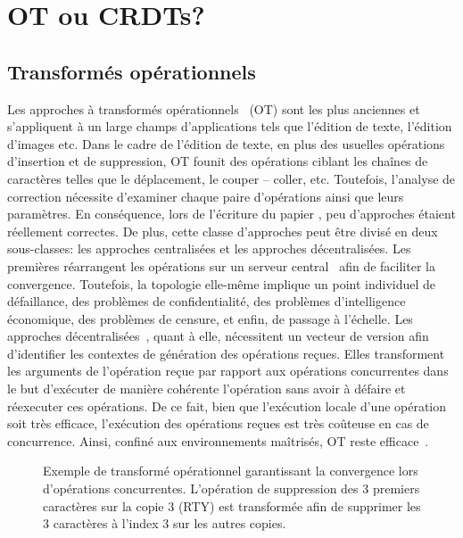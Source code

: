 
\section{OT ou CRDTs?}

\subsection{Transformés opérationnels}

Les approches à transformés opérationnels~\cite{sun1998operational,
  sun2009contextbased} (OT) sont les plus anciennes et s'appliquent à un large
champs d'applications tels que l'édition de texte, l'édition d'images etc. Dans
le cadre de l'édition de texte, en plus des usuelles opérations d'insertion et
de suppression, OT founit des opérations ciblant les chaînes de caractères
telles que le déplacement, le couper -- coller, etc. Toutefois, l'analyse de
correction nécessite d'examiner chaque paire d'opérations ainsi que leurs
paramètres. En conséquence, lors de l'écriture du papier
\cite{imine2003proving}, peu d'approches étaient réellement correctes. De plus,
cette classe d'approches peut être divisé en deux sous-classes: les approches
centralisées et les approches décentralisées. Les premières réarrangent les
opérations sur un serveur central~\cite{nichols1995high} afin de faciliter la
convergence. Toutefois, la topologie elle-même implique un point individuel de
défaillance, des problèmes de confidentialité, des problèmes d'intelligence
économique, des problèmes de censure, et enfin, de passage à l'échelle. Les
approches décentralisées~\cite{sun2009contextbased}, quant à elle, nécessitent
un vecteur de version afin d'identifier les contextes de génération des
opérations reçues. Elles transforment les arguments de l'opération reçue par
rapport aux opérations concurrentes dans le but d'exécuter de manière cohérente
l'opération sans avoir à défaire et réexecuter ces opérations. De ce fait, bien
que l'exécution locale d'une opération soit très efficace, l'exécution des
opérations reçues est très coûteuse en cas de concurrence. Ainsi, confiné aux
environnements maîtrisés, OT reste efficace~\cite{mehdi2014merging}.

\begin{figure}
  \centering
  
  \caption{\label{seq:fig:otexample}Exemple de transformé opérationnel
    garantissant la convergence lors d'opérations concurrentes. L'opération de
    suppression des 3 premiers caractères sur la copie 3 (RTY) est transformée
    afin de supprimer les 3 caractères à l'index 3 sur les autres copies.}
\end{figure}

